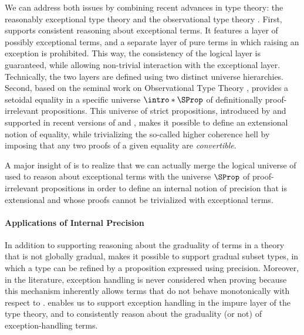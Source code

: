 \AP We can address both issues by combining recent advances in type theory:
the reasonably exceptional type theory  
and the observational type theory  .
First,  supports consistent reasoning about exceptional terms.
It features a layer of possibly exceptional terms,
and a separate layer of pure terms in which raising an exception is prohibited.
This way, the consistency of the logical layer is guaranteed,
while allowing non-trivial interaction with the exceptional layer.
Technically, the two layers are defined using two distinct universe hierarchies.
%
Second, based on the seminal work on Observational Type Theory , 
 provides a setoidal equality in a specific universe $\intro*\SProp$
of definitionally proof-irrelevant propositions. 
This universe of strict propositions, introduced by 
and supported in recent versions of  and , 
makes it possible to define an extensional notion of equality,
while trivializing the so-called higher coherence hell by imposing that any two proofs
of a given equality are \emph{convertible}.

A major insight of  is to realize that we can actually merge
the logical universe of  used to reason about exceptional terms
with the universe $\SProp$ of proof-irrelevant propositions in order to 
define an internal notion of precision that is extensional and whose proofs
cannot be trivialized with exceptional terms.

\paragraph{Applications of Internal Precision}

In addition to supporting reasoning about the graduality of terms in a theory
that is not globally gradual,  makes it possible
to support gradual subset types, in which a type can be refined
by a proposition expressed using precision.
Moreover, in the literature, exception handling is never considered
when proving  because this mechanism inherently allows terms that
do not behave monotonically with respect to .
 enables us to support exception handling in the impure layer
of the type theory,
and to consistently reason about the graduality (or not) of exception-handling terms.